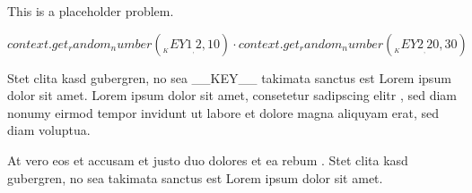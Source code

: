 This is a placeholder problem.
\begin{Problem}
\item ${{context.get_random_number(__KEY1__, 2, 10)}} \cdot {{context.get_random_number(__KEY2__, 20, 30)}}$
\item Stet clita kasd gubergren, no sea __KEY__ takimata sanctus est Lorem ipsum dolor sit amet. Lorem ipsum dolor sit amet, consetetur sadipscing elitr , sed diam nonumy eirmod tempor invidunt ut labore et dolore magna aliquyam erat, sed diam voluptua. 
\item At vero eos et accusam et justo duo dolores et ea rebum . Stet clita kasd gubergren, no sea takimata sanctus est Lorem ipsum dolor sit amet. 
\end{Problem}